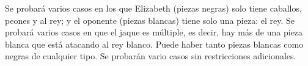 \documentclass{oci}
\begin{document}
\begin{scoreDescription}
  Se probará varios casos en los que Elizabeth (piezas negras) solo tiene caballos, peones
  y al rey; y el oponente (piezas blancas) tiene solo una pieza: el rey.
  Se probará varios casos en que el jaque es múltiple, es decir, hay más de una pieza
  blanca que está atacando al rey blanco.
  Puede haber tanto piezas blancas como negras de cualquier tipo.
  Se probarán vario casos sin restricciones adicionales.
\end{scoreDescription}

\begin{sampleDescription}
\end{sampleDescription}
\end{document}
